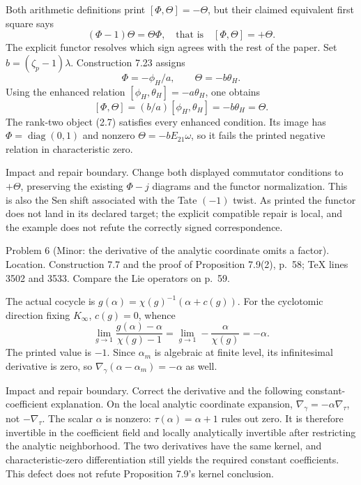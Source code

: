 \documentclass[10pt]{article}
\begin{document}
Both arithmetic definitions print \([\Phi,\Theta]=-\Theta\), but their claimed equivalent first square says \[(\Phi-1)\Theta=\Theta\Phi,\quad\text{that is}\quad
 [\Phi,\Theta]=+\Theta.                           \tag{2.10}\] The explicit functor resolves which sign agrees with the rest of the paper. Set \(b=(\zeta_p-1)\lambda\). Construction 7.23 assigns \[\Phi=-\phi_H/a,\qquad \Theta=-b\theta_H.\] Using the enhanced relation \([\phi_H,\theta_H]=-a\theta_H\), one obtains \[[\Phi,\Theta]=(b/a)[\phi_H,\theta_H]
             =-b\theta_H=\Theta.                 \tag{2.11}\] The rank-two object (2.7) satisfies every enhanced condition. Its image has \(\Phi=\operatorname{diag}(0,1)\) and nonzero \(\Theta=-bE_{21}\omega\), so it fails the printed negative relation in characteristic zero.\par
Impact and repair boundary. Change both displayed commutator conditions to \(+\Theta\), preserving the existing \(\Phi-j\) diagrams and the functor normalization. This is also the Sen shift associated with the Tate \((-1)\) twist. As printed the functor does not land in its declared target; the explicit compatible repair is local, and the example does not refute the correctly signed correspondence.\par
Problem 6 (Minor: the derivative of the analytic coordinate omits a factor).  Location. Construction 7.7 and the proof of Proposition 7.9(2), p. 58; TeX lines 3502 and 3533. Compare the Lie operators on p. 59.\par
The actual cocycle is \(g(\alpha)=\chi(g)^{-1}(\alpha+c(g))\). For the cyclotomic direction fixing \(K_\infty\), \(c(g)=0\), whence \[\lim_{g\to1}\frac{g(\alpha)-\alpha}{\chi(g)-1}
 =\lim_{g\to1}-\frac{\alpha}{\chi(g)}=-\alpha.
 \tag{2.12}\] The printed value is \(-1\). Since \(\alpha_m\) is algebraic at finite level, its infinitesimal derivative is zero, so \(\nabla_\gamma(\alpha-\alpha_m)=-\alpha\) as well.\par
Impact and repair boundary. Correct the derivative and the following constant-coefficient explanation. On the local analytic coordinate expansion, \(\nabla_\gamma=-\alpha\nabla_\tau\), not \(-\nabla_\tau\). The scalar \(\alpha\) is nonzero: \(\tau(\alpha)=\alpha+1\) rules out zero. It is therefore invertible in the coefficient field and locally analytically invertible after restricting the analytic neighborhood. The two derivatives have the same kernel, and characteristic-zero differentiation still yields the required constant coefficients. This defect does not refute Proposition 7.9’s kernel conclusion.\par
\end{document}
